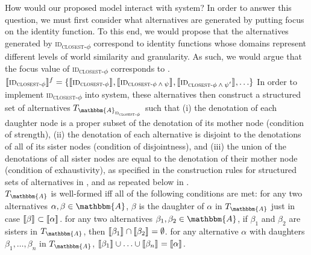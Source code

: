 How would our proposed model interact with  system? In order to answer this question, we must first consider what alternatives are generated by putting focus on the identity function. To this end, we would propose that the alternatives generated by {\scshape id\textsubscript{closest-$\phi$}} correspond to identity functions whose domains represent different levels of world similarity and granularity. As such, we would argue that the focus value of {\scshape id\textsubscript{closest-$\phi$}} corresponds to .
\ex{}\label{ex:alternativeids}
$\intension[f]{{\scshape id\textsubscript{closest-$\phi$}}}=\{\intension[]{{\scshape id\textsubscript{closest-$\phi$}}},\intension[]{{\scshape id\textsubscript{closest-$\phi\land\psi$}}},\intension[]{{\scshape id\textsubscript{closest-$\phi\land\psi'$}}},\ldots\}$
\xe
In order to implement {{\scshape id\textsubscript{closest-$\phi$}}} into  system, these alternatives then construct a structured set of alternatives $T_{\mathbbm{A}_\text{{\scshape id\textsubscript{closest-$\phi$}}}}$ such that (i) the denotation of each daughter node is a proper subset of the denotation of its mother node (condition of strength), (ii) the denotation of each alternative is disjoint to the denotations of all of its sister nodes (condition of disjointness), and (iii) the union of the denotations of all sister nodes are equal to the denotation of their mother node (condition of exhaustivity), as specified in the construction rules for structured sets of alternatives in , and as repeated below in .
\pex{}\label{def:alternativeconstruction-repeat1}
\\
$T_\mathbbm{A}$ is well-formed iff all of the following conditions are met:
\a{} {} for any two alternatives $\alpha,\beta\in\mathbbm{A}$, $\beta$ is the daughter of $\alpha$ in $T_\mathbbm{A}$ just in case $\intension[]{$\beta$}\subset\intension[]{$\alpha$}$.
\a{} {} for any two alternatives $\beta_1,\beta_2\in\mathbbm{A}$, if $\beta_1$ and $\beta_2$ are sisters in $T_\mathbbm{A}$, then $\intension[]{$\beta_1$}\cap\intension[]{$\beta_2$}=\emptyset$.
\a{} {} for any alternative $\alpha$ with daughters $\beta_1,\ldots,\beta_n$ in $T_\mathbbm{A}$, $\intension[]{$\beta_1$}\cup\ldots\cup\intension[]{$\beta_n$}=\intension[]{$\alpha$}$.\hfill\parencite[p. 640]{Ippolito2020}
\xe

